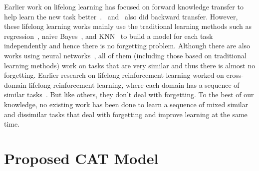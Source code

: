 \documentclass{article}
\begin{document}
Earlier work on lifelong learning has focused on forward knowledge transfer to help learn the new task better~\citep{thrun1998lifelong,ruvolo2013ella,Silver2013,chen2015lifelong,mitchell2015never}.~\cite{ke2020continual} and~\cite{hao2019forward} also did backward transfer. However, these lifelong learning works mainly use the traditional learning methods such as regression~\citep{ruvolo2013ella}, naive Bayes~\citep{chen2015lifelong,hao2019forward}, and KNN~\citep{thrun1998lifelong} to build a model for each task independently and hence there is no forgetting problem. Although there are also works using neural networks~\citep{ke2020continual,Wang2018lifelong, thrun1998lifelong,Silver2013}, all of them (including those based on traditional learning methods) work on tasks that are very similar and thus there is almost no forgetting. Earlier research on lifelong reinforcement learning worked on cross-domain lifelong reinforcement learning, where each domain has a sequence of similar tasks~\citep{wilson2007multi,BouAmmar2015CrossDomainLRL}. But like others, they don't deal with forgetting. To the best of our knowledge, no existing work has been done to learn a sequence of mixed similar and dissimilar tasks that deal with forgetting and improve learning at the same time. 




\section{Proposed CAT Model}
\end{document}
